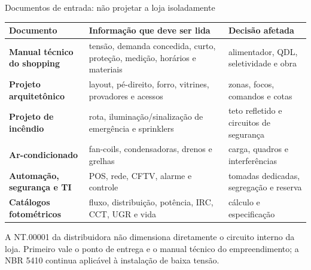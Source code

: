 \begin{frame}{Documentos de entrada: não projetar a loja isoladamente}
\scriptsize
\begin{tabularx}{\textwidth}{>{\bfseries}p{3.0cm}X X}
\toprule
Documento & Informação que deve ser lida & Decisão afetada \\
\midrule
Manual técnico do shopping & tensão, demanda concedida, curto, proteção, medição, horários e materiais & alimentador, QDL, seletividade e obra \\
Projeto arquitetônico & layout, pé-direito, forro, vitrines, provadores e acessos & zonas, focos, comandos e cotas \\
Projeto de incêndio & rota, iluminação/sinalização de emergência e sprinklers & teto refletido e circuitos de segurança \\
Ar-condicionado & fan-coils, condensadoras, drenos e grelhas & carga, quadros e interferências \\
Automação, segurança e TI & POS, rede, CFTV, alarme e controle & tomadas dedicadas, segregação e reserva \\
Catálogos fotométricos & fluxo, distribuição, potência, IRC, CCT, UGR e vida & cálculo e especificação \\
\bottomrule
\end{tabularx}
\begin{caixaAt}
A NT.00001 da distribuidora não dimensiona diretamente o circuito interno da loja. Primeiro vale o ponto de entrega e o manual técnico do empreendimento; a NBR 5410 continua aplicável à instalação de baixa tensão.
\end{caixaAt}
\end{frame}

